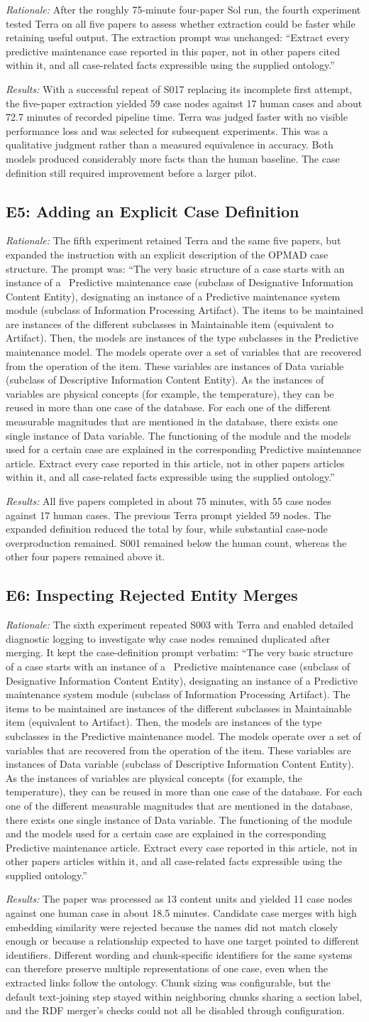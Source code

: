 \documentclass[journal]{IEEEtran}
\newcommand{\ownCasesPrompt}{Extract every predictive maintenance case reported in this paper, not in other papers cited within it, and all case-related facts expressible using the supplied ontology.}
\newcommand{\caseDefinitionPrompt}{The very basic structure of a case starts with an instance of a \ \textasciigrave{}Predictive maintenance case\textasciigrave{} (subclass of \textasciigrave{}Designative Information Content Entity\textasciigrave{}), designating an instance of a \textasciigrave{}Predictive maintenance system module\textasciigrave{} (subclass of \textasciigrave{}Information Processing Artifact\textasciigrave{}). The items to be maintained are instances of the diﬀerent subclasses in \textasciigrave{}Maintainable item\textasciigrave{} (equivalent to \textasciigrave{}Artifact\textasciigrave{}). Then, the models are instances of the type subclasses in the \textasciigrave{}Predictive maintenance model\textasciigrave{}. The models operate over a set of variables that are recovered from the operation of the item. These variables are instances of \textasciigrave{}Data variable\textasciigrave{} (subclass of \textasciigrave{}Descriptive Information Content Entity\textasciigrave{}). As the instances of variables are physical concepts (for example, the temperature), they can be reused in more than one case of the database. For each one of the diﬀerent measurable magnitudes that are mentioned in the database, there exists one single instance of \textasciigrave{}Data variable\textasciigrave{}. The functioning of the module and the models used for a certain case are explained in the corresponding \textasciigrave{}Predictive maintenance article\textasciigrave{}. Extract every case reported in this article, not in other papers articles within it, and all case-related facts expressible using the supplied ontology.}
\begin{document}
\emph{Rationale:} After the roughly 75-minute four-paper Sol run, the fourth experiment tested Terra on all five papers to assess whether extraction could be faster while retaining useful output. The extraction prompt was unchanged: ``\ownCasesPrompt''

\emph{Results:} With a successful repeat of S017 replacing its incomplete first attempt, the five-paper extraction yielded 59 case nodes against 17 human cases and about 72.7 minutes of recorded pipeline time. Terra was judged faster with no visible performance loss and was selected for subsequent experiments. This was a qualitative judgment rather than a measured equivalence in accuracy. Both models produced considerably more facts than the human baseline. The case definition still required improvement before a larger pilot.

\subsection{E5: Adding an Explicit Case Definition}
\label{exp:case-definition}

\emph{Rationale:} The fifth experiment retained Terra and the same five papers, but expanded the instruction with an explicit description of the OPMAD case structure. The prompt was: ``\caseDefinitionPrompt''

\emph{Results:} All five papers completed in about 75 minutes, with 55 case nodes against 17 human cases. The previous Terra prompt yielded 59 nodes. The expanded definition reduced the total by four, while substantial case-node overproduction remained. S001 remained below the human count, whereas the other four papers remained above it.

\subsection{E6: Inspecting Rejected Entity Merges}
\label{exp:merge-debug}

\emph{Rationale:} The sixth experiment repeated S003 with Terra and enabled detailed diagnostic logging to investigate why case nodes remained duplicated after merging. It kept the case-definition prompt verbatim: ``\caseDefinitionPrompt''

\emph{Results:} The paper was processed as 13 content units and yielded 11 case nodes against one human case in about 18.5 minutes. Candidate case merges with high embedding similarity were rejected because the names did not match closely enough or because a relationship expected to have one target pointed to different identifiers. Different wording and chunk-specific identifiers for the same systems can therefore preserve multiple representations of one case, even when the extracted links follow the ontology. Chunk sizing was configurable, but the default text-joining step stayed within neighboring chunks sharing a section label, and the RDF merger's checks could not all be disabled through configuration.
\end{document}
